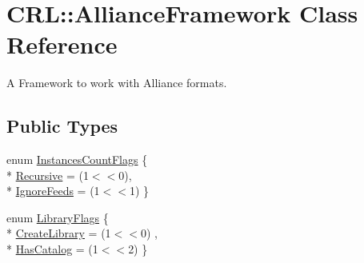 \hypertarget{classCRL_1_1AllianceFramework}{\section{C\-R\-L\-:\-:Alliance\-Framework Class Reference}
\label{classCRL_1_1AllianceFramework}
}


A Framework to work with Alliance formats.  


\subsection*{Public Types}
\begin{DoxyCompactItemize}
\item 
enum \hyperlink{classCRL_1_1AllianceFramework_a03ef94e043d2d25eb7a6a5f1ae176432}{Instances\-Count\-Flags} \{ \\*
\hyperlink{classCRL_1_1AllianceFramework_a03ef94e043d2d25eb7a6a5f1ae176432a3c65ebdaecc4b34b54a01ff3a5c3195a}{Recursive} = (1$<$$<$0), 
\\*
\hyperlink{classCRL_1_1AllianceFramework_a03ef94e043d2d25eb7a6a5f1ae176432a4a10630340ffb5b0aa9983f8b7f4cbe0}{Ignore\-Feeds} = (1$<$$<$1)
 \}
\item 
enum \hyperlink{classCRL_1_1AllianceFramework_a0ec1cd09dec34dfecfec22927b92cc25}{Library\-Flags} \{ \\*
\hyperlink{classCRL_1_1AllianceFramework_a0ec1cd09dec34dfecfec22927b92cc25ade58398b3ec849dc3aedb6a0812fbc7a}{Create\-Library} = (1$<$$<$0)
, \\*
\hyperlink{classCRL_1_1AllianceFramework_a0ec1cd09dec34dfecfec22927b92cc25a8d9678631764327cbfe81f8184fa9e05}{Has\-Catalog} = (1$<$$<$2)
 \}
\end{DoxyCompactItemize}
